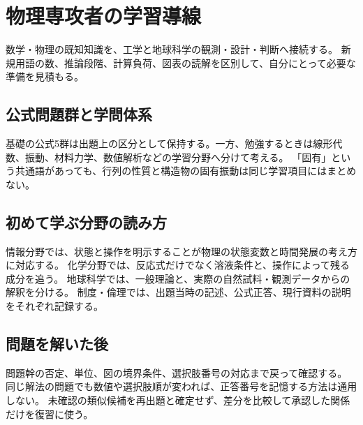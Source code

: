 \chapter{物理専攻者の学習導線}
数学・物理の既知知識を、工学と地球科学の観測・設計・判断へ接続する。
新規用語の数、推論段階、計算負荷、図表の読解を区別して、自分にとって必要な準備を見積もる。
\section{公式問題群と学問体系}
基礎の公式5群は出題上の区分として保持する。一方、勉強するときは線形代数、振動、材料力学、数値解析などの学習分野へ分けて考える。
「固有」という共通語があっても、行列の性質と構造物の固有振動は同じ学習項目にはまとめない。
\section{初めて学ぶ分野の読み方}
情報分野では、状態と操作を明示することが物理の状態変数と時間発展の考え方に対応する。
化学分野では、反応式だけでなく溶液条件と、操作によって残る成分を追う。
地球科学では、一般理論と、実際の自然試料・観測データからの解釈を分ける。
制度・倫理では、出題当時の記述、公式正答、現行資料の説明をそれぞれ記録する。
\section{問題を解いた後}
問題幹の否定、単位、図の境界条件、選択肢番号の対応まで戻って確認する。
同じ解法の問題でも数値や選択肢順が変われば、正答番号を記憶する方法は通用しない。
未確認の類似候補を再出題と確定せず、差分を比較して承認した関係だけを復習に使う。
